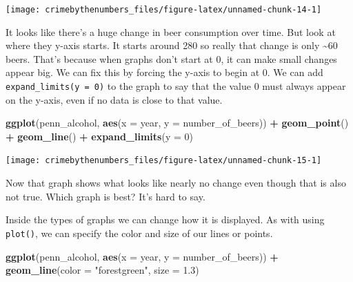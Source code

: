 \documentclass[
  12pt,
]{book}
\newenvironment{Shaded}{\begin{snugshade}}{\end{snugshade}}
\newcommand{\DataTypeTok}[1]{\textcolor[rgb]{0.27,0.27,0.27}{#1}}
\newcommand{\DecValTok}[1]{\textcolor[rgb]{0.06,0.06,0.06}{#1}}
\newcommand{\FloatTok}[1]{\textcolor[rgb]{0.06,0.06,0.06}{#1}}
\newcommand{\KeywordTok}[1]{\textcolor[rgb]{0.27,0.27,0.27}{\textbf{#1}}}
\newcommand{\NormalTok}[1]{#1}
\newcommand{\OperatorTok}[1]{\textcolor[rgb]{0.43,0.43,0.43}{\textbf{#1}}}
\newcommand{\StringTok}[1]{\textcolor[rgb]{0.5,0.5,0.5}{#1}}
\begin{document}
\begin{center}\texttt{[image: crimebythenumbers\_files/figure-latex/unnamed-chunk-14-1]} \end{center}

It looks like there's a huge change in beer consumption over time. But look at where they y-axis starts. It starts around 280 so really that change is only \textasciitilde60 beers. That's because when graphs don't start at 0, it can make small changes appear big. We can fix this by forcing the y-axis to begin at 0. We can add \texttt{expand\_limits(y\ =\ 0)} to the graph to say that the value 0 must always appear on the y-axis, even if no data is close to that value.

\begin{Shaded}
\begin{Highlighting}[]
\KeywordTok{ggplot}\NormalTok{(penn\_alcohol, }\KeywordTok{aes}\NormalTok{(}\DataTypeTok{x =}\NormalTok{ year, }\DataTypeTok{y =}\NormalTok{ number\_of\_beers)) }\OperatorTok{+}
\StringTok{  }\KeywordTok{geom\_point}\NormalTok{() }\OperatorTok{+}
\StringTok{  }\KeywordTok{geom\_line}\NormalTok{() }\OperatorTok{+}
\StringTok{  }\KeywordTok{expand\_limits}\NormalTok{(}\DataTypeTok{y =} \DecValTok{0}\NormalTok{)}
\end{Highlighting}
\end{Shaded}

\begin{center}\texttt{[image: crimebythenumbers\_files/figure-latex/unnamed-chunk-15-1]} \end{center}

Now that graph shows what looks like nearly no change even though that is also not true. Which graph is best? It's hard to say.

Inside the types of graphs we can change how it is displayed. As with using \texttt{plot()}, we can specify the color and size of our lines or points.

\begin{Shaded}
\begin{Highlighting}[]
\KeywordTok{ggplot}\NormalTok{(penn\_alcohol, }\KeywordTok{aes}\NormalTok{(}\DataTypeTok{x =}\NormalTok{ year, }\DataTypeTok{y =}\NormalTok{ number\_of\_beers)) }\OperatorTok{+}
\StringTok{  }\KeywordTok{geom\_line}\NormalTok{(}\DataTypeTok{color =} \StringTok{"forestgreen"}\NormalTok{, }\DataTypeTok{size =} \FloatTok{1.3}\NormalTok{)}
\end{Highlighting}
\end{Shaded}
\end{document}
